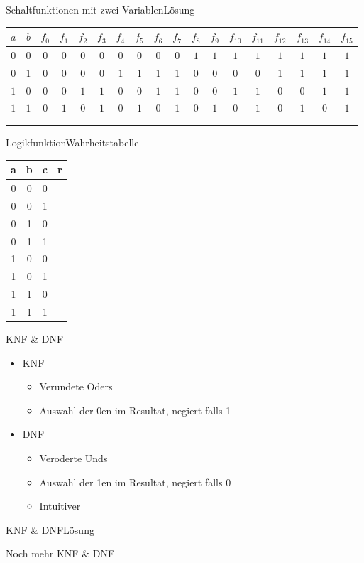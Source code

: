 \documentclass[
  german,            %
  aspectratio=169,    %
  sectionpage=false,   %
]{tumbeamer}
\begin{document}
\begin{frame}{Schaltfunktionen mit zwei Variablen}{Lösung}
	\begin{center}\begin{tabular}{|cc|cccccccccccccccc|}
			\hline
			$a$ & $b$ & $f_0$ & $f_1$ & $f_2$ & $f_3$ & $f_4$ & $f_5$ & $f_6$ & $f_7$ & $f_8$ & $f_9$ & $f_{10}$ & $f_{11}$ & $f_{12}$ & $f_{13}$ & $f_{14}$ & $f_{15}$ \\
			\hline
			$0$ & $0$ & $0$   & $0$   & $0$   & $0$   & $0$   & $0$   & $0$   & $0$   & $1$   & $1$   & $1$    & $1$    & $1$    & $1$    & $1$    & $1$    \\
			$0$ & $1$ & $0$   & $0$   & $0$   & $0$   & $1$   & $1$   & $1$   & $1$   & $0$   & $0$   & $0$    & $0$    & $1$    & $1$    & $1$    & $1$    \\
			$1$ & $0$ & $0$   & $0$   & $1$   & $1$   & $0$   & $0$   & $1$   & $1$   & $0$   & $0$   & $1$    & $1$    & $0$    & $0$    & $1$    & $1$    \\
			$1$ & $1$ & $0$   & $1$   & $0$   & $1$   & $0$   & $1$   & $0$   & $1$   & $0$   & $1$   & $0$    & $1$    & $0$    & $1$    & $0$    & $1$    \\
			& & & & & & & & & & & & & & & & &
			\\			
			& & & & & & & & & & & & & & & & &
			\\

			\hline
	\end{tabular}\end{center}
	
	
\end{frame}
\begin{frame}{Logikfunktion}{Wahrheitstabelle}
\begin{tabular}[t]{ccc|r}
	a & b & c & r \\
	\hline
	0 & 0 & 0 &  \\
	0 & 0 & 1 &  \\
	0 & 1 & 0 &  \\
	0 & 1 & 1 &  \\
	1 & 0 & 0 &  \\
	1 & 0 & 1 &  \\
	1 & 1 & 0 &  \\
	1 & 1 & 1 &  \\
\end{tabular}
\end{frame}
\begin{frame}{KNF \& DNF}
	\begin{itemize}
		\item KNF
		\begin{itemize}
			\item Verundete Oders
			\item Auswahl der 0en im Resultat, negiert falls 1
		\end{itemize}
		\item DNF
		\begin{itemize}
			\item Veroderte Unds
			\item Auswahl der 1en im Resultat, negiert falls 0
			\item Intuitiver
		\end{itemize}
	\end{itemize}
\end{frame}
\begin{frame}{KNF \& DNF}{Lösung}
\end{frame}
\begin{frame}{Noch mehr KNF \& DNF}
\end{frame}
\end{document}
